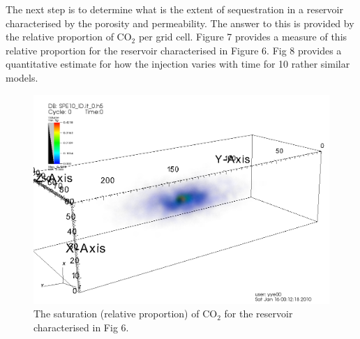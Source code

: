 \documentclass{acm_proc_article-sp}
\begin{document}
The next step is to determine what is the extent of sequestration in a
reservoir characterised by the porosity and permeability.  The answer
to this is provided by the relative proportion of CO$_2$ per grid
cell. Figure 7 provides a measure of this relative proportion for the 
reservoir characterised in Figure 6. Fig 8 provides a quantitative
estimate for how the injection varies with time for 10 rather similar
models. 

\begin{figure}
\begin{center}
\includegraphics[scale=0.2]{figures/visit0001.png} 
\end{center}
\caption[Simulation Output]{The saturation (relative proportion) of
  CO$_2$ for the reservoir characterised in Fig 6.}
\label{}
\end{figure}
\end{document}
